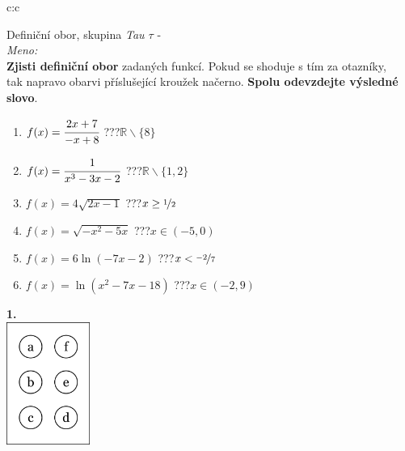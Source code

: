 \documentclass[10pt]{report}
\begin{document}
\begin{tabular}{c:c}
\begin{minipage}[c][99mm][t]{0.49\linewidth}
\begin{center}
\vspace{7mm}
{\huge Definiční obor, skupina \textit{Tau $\tau$} -}\\[4.5mm]
\textit{Meno:}\phantom{xxxxxxxxxxxxxxxxxxxxxxxxxxxxxxxxxxxxxxxxxxxxxxxxxxxxxxxxxxxxxxxxx}\\[3.5mm]
\textbf{Zjisti definiční obor} zadaných funkcí. Pokud se shoduje s tím za otazníky,\\tak napravo obarvi příslušející kroužek načerno. \textbf{Spolu odevzdejte výsledné slovo}.\\[3mm]
\begin{minipage}{0.77\linewidth}
\begin{center}
\begin{varwidth}{\textwidth}
\begin{enumerate}
\normalsize
\item $f(x)=\cfrac{2x+7}{-x+8}$\quad \dotfill\; ???\;\dotfill \quad $\mathbb{R}\smallsetminus\{8\}$
\item $f(x)=\cfrac{1}{x^3-3x-2}$\quad \dotfill\; ???\;\dotfill \quad $\mathbb{R}\smallsetminus\{1,2\}$
\item $f(x)=4\sqrt{2x-1}$\quad \dotfill\; ???\;\dotfill \quad $x\geq\nicefrac{1}{2}$
\item $f(x)=\sqrt{-x^2-5x}$\quad \dotfill\; ???\;\dotfill \quad $x\in(-5 , 0)$
\item $f(x)=6\ln{(-7x-2)}$\quad \dotfill\; ???\;\dotfill \quad $x<\nicefrac{-2}{7}$
\item $f(x)=\ln{(x^2-7x-18)}$\quad \dotfill\; ???\;\dotfill \quad $x\in(-2 , 9)$
\end{enumerate}
\end{varwidth}
\end{center}
\end{minipage}
\begin{minipage}{0.20\linewidth}
\begin{center}
{\Huge\bfseries 1.} \\[2mm]
\includegraphics[height=40mm]{../images/braille.png}

\end{center}
\end{minipage}
\end{center}
\end{minipage}
\end{tabular}
\end{document}
